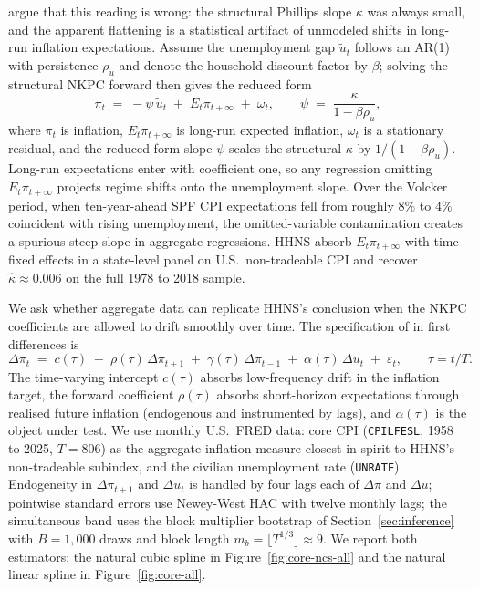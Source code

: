\documentclass[12pt]{article}
\begin{document}
\citet{Hazell2022} argue that this reading is wrong: the structural Phillips slope $\kappa$ was always small, and the apparent flattening is a statistical artifact of unmodeled shifts in long-run inflation expectations. Assume the unemployment gap $\tilde u_t$ follows an AR(1) with persistence $\rho_u$ and denote the household discount factor by $\beta$; solving the structural NKPC forward then gives the reduced form
\[
  \pi_t \;=\; -\psi\, \tilde u_t \;+\; E_t \pi_{t+\infty} \;+\; \omega_t, \qquad \psi \;=\; \frac{\kappa}{1-\beta \rho_u},
\]
where $\pi_t$ is inflation, $E_t \pi_{t+\infty}$ is long-run expected inflation, $\omega_t$ is a stationary residual, and the reduced-form slope $\psi$ scales the structural $\kappa$ by $1/(1-\beta\rho_u)$. Long-run expectations enter with coefficient one, so any regression omitting $E_t \pi_{t+\infty}$ projects regime shifts onto the unemployment slope. Over the Volcker period, when ten-year-ahead SPF CPI expectations fell from roughly $8\%$ to $4\%$ coincident with rising unemployment, the omitted-variable contamination creates a spurious steep slope in aggregate regressions. HHNS absorb $E_t \pi_{t+\infty}$ with time fixed effects in a state-level panel on U.S.\ non-tradeable CPI and recover $\hat\kappa \approx 0.006$ on the full 1978 to 2018 sample.

We ask whether aggregate data can replicate HHNS's conclusion when the NKPC coefficients are allowed to drift smoothly over time. The specification of \citet{GaliGertler1999} in first differences is
\begin{equation}\label{eq:nkpc}
  \Delta\pi_t \;=\; c(\tau) \;+\; \rho(\tau)\,\Delta\pi_{t+1} \;+\; \gamma(\tau)\,\Delta\pi_{t-1} \;+\; \alpha(\tau)\,\Delta u_t \;+\; \varepsilon_t, \qquad \tau = t/T.
\end{equation}
The time-varying intercept $c(\tau)$ absorbs low-frequency drift in the inflation target, the forward coefficient $\rho(\tau)$ absorbs short-horizon expectations through realised future inflation (endogenous and instrumented by lags), and $\alpha(\tau)$ is the object under test. We use monthly U.S.\ FRED data: core CPI (\texttt{CPILFESL}, 1958 to 2025, $T = 806$) as the aggregate inflation measure closest in spirit to HHNS's non-tradeable subindex, and the civilian unemployment rate (\texttt{UNRATE}). Endogeneity in $\Delta\pi_{t+1}$ and $\Delta u_t$ is handled by four lags each of $\Delta\pi$ and $\Delta u$; pointwise standard errors use Newey-West HAC with twelve monthly lags; the simultaneous band uses the block multiplier bootstrap of Section~\ref{sec:inference} with $B = 1{,}000$ draws and block length $m_b = \lfloor T^{1/3}\rfloor \approx 9$. We report both estimators: the natural cubic spline in Figure~\ref{fig:core-ncs-all} and the natural linear spline in Figure~\ref{fig:core-all}.
\end{document}
